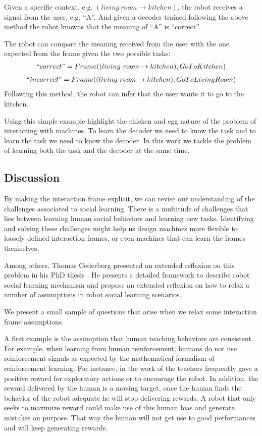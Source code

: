 Given a specific context, e.g. $(living~room \rightarrow kitchen)$, the robot receives a signal from the user, e.g. ``A''. And given a decoder trained following the above method the robot knowns that the meaning of ``A'' is ``correct''.

The robot can compare the meaning received from the user with the one expected from the frame given the two possible tasks:
%
\begin{eqnarray}
``correct" = Frame((living~room \rightarrow kitchen), Go To Kitchen) \nonumber
\end{eqnarray}
\begin{eqnarray}
``incorrect" = Frame((living~room \rightarrow kitchen), Go To Living Room) \nonumber
\end{eqnarray}
%
Following this method, the robot can infer that the user wants it to go to the kitchen.

\transition

Using this simple example highlight the chicken and egg nature of the problem of interacting with machines. To learn the decoder we need to know the task and to learn the task we need to know the decoder. In this work we tackle the problem of learning both the task and the decoder at the same time.

\subsection{Discussion}

By making the interaction frame explicit, we can revise our understanding of the challenges associated to social learning. There is a multitude of challenges that lies between learning human social behaviors and learning new tasks. Identifying and solving these challenges might help us design machines more flexible to loosely defined interaction frames, or even machines that can learn the frames themselves.

Among others, Thomas Cederborg presented an extended reflexion on this problem in his PhD thesis \cite{cederborg2014thesis}. He presents a detailed framework to describe robot social learning mechanism \cite{cederborg2014social} and propose an extended reflexion on how to relax a number of assumptions in robot social learning scenarios. 

We present a small sample of questions that arise when we relax some interaction frame assumptions.

A first example is the assumption that human teaching behaviors are consistent. For example, when learning from human reinforcement, humans do not use reinforcement signals as expected by the mathematical formalism of reinforcement learning. For instance, in the work of \cite{thomaz2008teachable} the teachers frequently gave a positive reward for exploratory actions or to encourage the robot. In addition, the reward delivered by the human is a moving target, once the human finds the behavior of the robot adequate he will stop delivering rewards. A robot that only seeks to maximize reward could make use of this human bias and generate mistakes on purpose. That way the human will not get use to good performances and will keep generating rewards.

